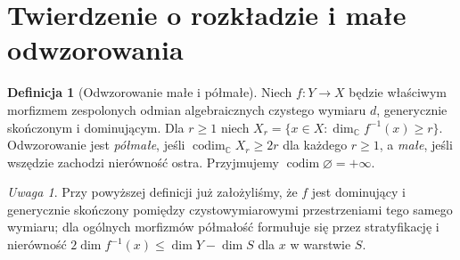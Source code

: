 \documentclass[11pt,a4paper,oneside]{report}
\newcommand{\C}{\mathbb{C}}
\theoremstyle{plain}
\theoremstyle{definition}
\newtheorem{definicja}[twierdzenie]{Definicja}
\theoremstyle{remark}
\newtheorem{uwaga}[twierdzenie]{Uwaga}
\begin{document}
\section{Twierdzenie o rozkładzie i małe odwzorowania}
\begin{definicja}[Odwzorowanie małe i półmałe]
Niech $f:Y\to X$ będzie właściwym morfizmem
zespolonych odmian algebraicznych czystego wymiaru $d$,
generycznie skończonym i dominującym. Dla $r\ge1$
niech $X_r=\{x\in X:\dim_\C f^{-1}(x)\ge r\}$.
Odwzorowanie jest \emph{półmałe}, jeśli
$\operatorname{codim}_\C X_r\ge2r$ dla każdego $r\ge1$,
a \emph{małe}, jeśli wszędzie zachodzi
nierówność ostra. Przyjmujemy
$\operatorname{codim}\varnothing=+\infty$.
\end{definicja}
\begin{uwaga}
Przy powyższej definicji już założyliśmy, że $f$ jest
dominujący i generycznie skończony pomiędzy
czystowymiarowymi przestrzeniami tego samego wymiaru;
dla ogólnych morfizmów półmałość formułuje się przez
stratyfikację i nierówność
$2\dim f^{-1}(x)\le\dim Y-\dim S$
dla $x$ w warstwie $S$.
\end{uwaga}
\end{document}
